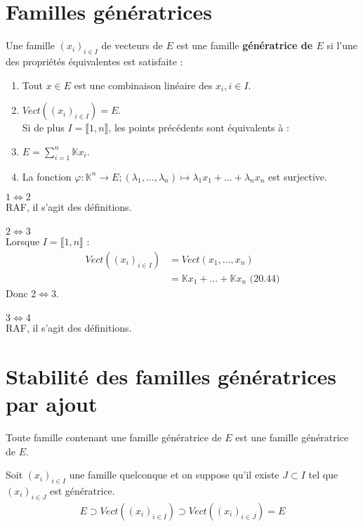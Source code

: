 \documentclass[../main.tex]{subfiles}
\begin{document}
\section{Familles génératrices}
\begin{tcolorbox}[title=Propostion 20.66, title filled=false, colframe=lightblue, colback=lightblue!10!white]
    Une famille $(x_i)_{i\in I}$ de vecteurs de $E$ est une famille \textbf{génératrice de $E$} si l'une des propriétés équivalentes est satisfaite : 
    \begin{enumerate}
        \item Tout $x\in E$ est une combinaison linéaire des $x_i, i\in I$. 
        \item $Vect((x_i)_{i\in I}) = E$. \\
        Si de plus $I = \llbracket 1, n \rrbracket$, les points précédents sont équivalents à : 
        \item $E = \sum\limits_{i=1}^{n} \mathbb{K} x_i$. 
        \item La fonction $\varphi: \mathbb{K}^n \to E; (\lambda_1, \ldots, \lambda_n) \mapsto \lambda_1 x_1 + \ldots + \lambda_n x_n$ est surjective.
    \end{enumerate}
\end{tcolorbox}

$\boxed{1 \Leftrightarrow 2}$ \\
RAF, il s'agit des définitions. \\ \\

$\boxed{2 \Leftrightarrow 3}$ \\
Lorsque $I = \llbracket 1, n \rrbracket$ : 
\begin{align*}
    Vect((x_i)_{i\in I}) &= Vect(x_1, \ldots, x_n) \\
    &= \mathbb{K} x_1 + \ldots + \mathbb{K} x_n \text{ (20.44)}
\end{align*}
Donc $2 \Leftrightarrow 3$. \\ \\

$\boxed{3 \Leftrightarrow 4}$ \\
RAF, il s'agit des définitions.

\section{Stabilité des familles génératrices par ajout}
\begin{tcolorbox}[title=Propostion 20.68, title filled=false, colframe=lightblue, colback=lightblue!10!white]
    Toute famille contenant une famille génératrice de $E$ est une famille génératrice de $E$.
\end{tcolorbox}

\noindent Soit $(x_i)_{i\in I}$ une famille quelconque et on suppose qu'il existe $J \subset I$ tel que $(x_i)_{i\in J}$ est génératrice. \\
\begin{align*}
    E \supset Vect((x_i)_{i\in I}) \supset Vect((x_i)_{i\in J}) = E
\end{align*}
\end{document}
